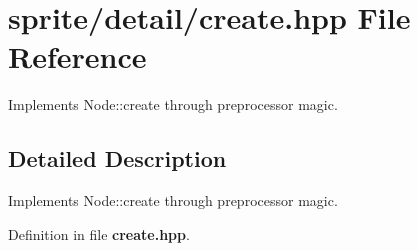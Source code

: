 \section{sprite/detail/create.hpp File Reference}
\label{detail_2create_8hpp}
Implements Node::create through preprocessor magic. 



\subsection{Detailed Description}
Implements Node::create through preprocessor magic. 



Definition in file {\bf create.hpp}.